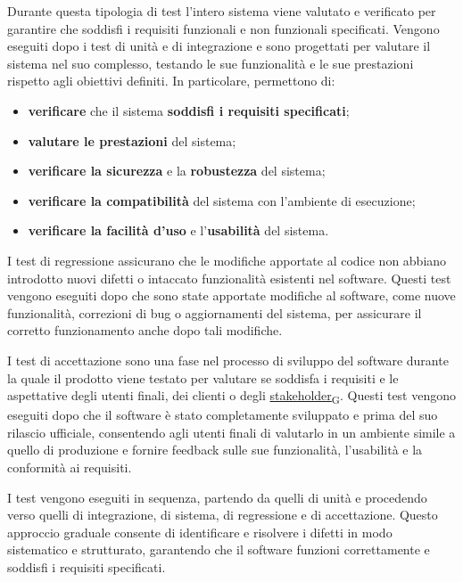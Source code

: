 Durante questa tipologia di test l'intero sistema viene valutato e verificato per garantire che soddisfi i requisiti funzionali e non funzionali specificati. Vengono eseguiti dopo i test di unità e di integrazione e sono progettati per valutare il sistema nel suo complesso, testando le sue funzionalità e le sue prestazioni rispetto agli obiettivi definiti. In particolare, permettono di:
\begin{itemize}
	\item \textbf{verificare} che il sistema \textbf{soddisfi i requisiti specificati};
	\item \textbf{valutare le prestazioni} del sistema;
	\item \textbf{verificare la sicurezza} e la \textbf{robustezza} del sistema;
	\item \textbf{verificare la compatibilità} del sistema con l'ambiente di esecuzione;
	\item \textbf{verificare la facilità d'uso} e l'\textbf{usabilità} del sistema.
\end{itemize}

I test di regressione assicurano che le modifiche apportate al codice non abbiano introdotto nuovi difetti o intaccato funzionalità esistenti nel software. Questi test vengono eseguiti dopo che sono state apportate modifiche al software, come nuove funzionalità, correzioni di bug o aggiornamenti del sistema, per assicurare il corretto funzionamento anche dopo tali modifiche.

I test di accettazione sono una fase nel processo di sviluppo del software durante la quale il prodotto viene testato per valutare se soddisfa i requisiti e le aspettative degli utenti finali, dei clienti o degli \href{https://7last.github.io/docs/pb/documentazione-interna/glossario\#stakeholder}{stakeholder\textsubscript{G}}. Questi test vengono eseguiti dopo che il software è stato completamente sviluppato e prima del suo rilascio ufficiale, consentendo agli utenti finali di valutarlo in un ambiente simile a quello di produzione e fornire feedback sulle sue funzionalità, l'usabilità e la conformità ai requisiti.

I test vengono eseguiti in sequenza, partendo da quelli di unità e procedendo verso quelli di integrazione, di sistema, di regressione e di accettazione. Questo approccio graduale consente di identificare e risolvere i difetti in modo sistematico e strutturato, garantendo che il software funzioni correttamente e soddisfi i requisiti specificati.

